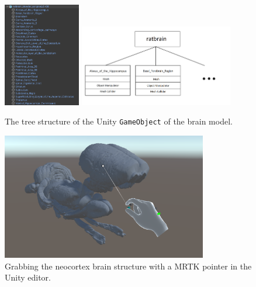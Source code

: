 
\begin{figure}[ht]
    \centering
    \includegraphics[width=0.30\textwidth]{fig/brainunitytree.png}
    \includegraphics[width=0.60\textwidth]{fig/shittyassbraintreediagram.png}
    \caption{The tree structure of the Unity \texttt{GameObject} of the brain model.}
    \label{fig:brainunitytree}
\end{figure}

\begin{figure}[ht]
    \centering
    \includegraphics[width=0.8\textwidth]{fig/grabbrainsection.png}
    \caption{Grabbing the neocortex brain structure with a MRTK pointer in the Unity editor.}
    \label{fig:grabbrain}
\end{figure}

